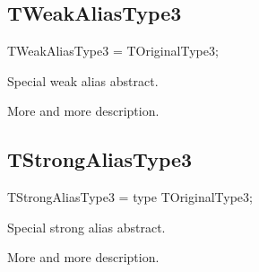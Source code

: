 \documentclass{report}
\begin{document}
\subsection*{TWeakAliasType3}
\begin{list}{}{
\setlength{\itemindent}{0cm}
\setlength{\listparindent}{0cm}
\setlength{\leftmargin}{\evensidemargin}
\addtolength{\leftmargin}{\tmplength}
\settowidth{\labelsep}{X}
\addtolength{\leftmargin}{\labelsep}
\setlength{\labelwidth}{\tmplength}
}
\begin{flushleft}
\item[\textbf{Declaration}\hfill]
\begin{ttfamily}
TWeakAliasType3 = TOriginalType3;\end{ttfamily}


\end{flushleft}
\par
\item[\textbf{Description}]
Special weak alias abstract.\hfill\vspace*{1ex}

 More and more description.

\end{list}
\subsection*{TStrongAliasType3}
\begin{list}{}{
\setlength{\itemindent}{0cm}
\setlength{\listparindent}{0cm}
\setlength{\leftmargin}{\evensidemargin}
\addtolength{\leftmargin}{\tmplength}
\settowidth{\labelsep}{X}
\addtolength{\leftmargin}{\labelsep}
\setlength{\labelwidth}{\tmplength}
}
\begin{flushleft}
\item[\textbf{Declaration}\hfill]
\begin{ttfamily}
TStrongAliasType3 = type TOriginalType3;\end{ttfamily}


\end{flushleft}
\par
\item[\textbf{Description}]
Special strong alias abstract.\hfill\vspace*{1ex}

 More and more description.

\end{list}
\end{document}
